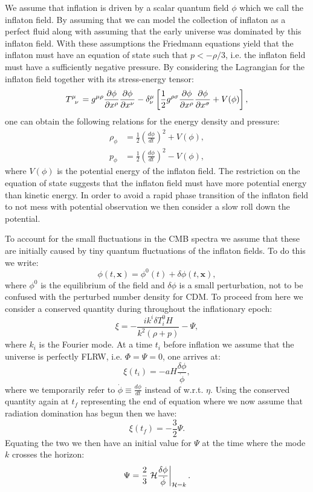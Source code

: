 \documentclass[%
reprint,
 amsmath,amssymb,
 aps,
]{revtex4-2}
\newcommand{\Hp}{\mathcal{H}}
\begin{document}
We assume that inflation is driven by a scalar quantum field $\phi$ which we call the inflaton field. By assuming that we can model the collection of inflaton as a perfect fluid along with assuming that the early universe was dominated by this inflaton field. With these assumptions the Friedmann equations yield that the inflaton must have an equation of state such that $p<-\rho/3$, i.e. the inflaton field must have a sufficiently negative pressure. By considering the Lagrangian for the inflaton field together with its stress-energy tensor: \cite{Dodelson:2003ft}
\[\tensor{T}{^\mu_\nu}=g^{\mu\rho}\pdv{\phi}{x^\rho}\pdv{\phi}{x^\nu}-\delta^\mu_\nu\left[\frac{1}{2}g^{\rho\sigma}\pdv{\phi}{x^\rho}\pdv{\phi}{x^\sigma}+V(\phi)\right],\]
one can obtain the following relations for the energy density and pressure:
\begin{align*}
	\rho_\phi&=\frac{1}{2}\left(\frac{d\phi}{dt}\right)^2+V(\phi),\\
	p_\phi&=\frac{1}{2}\left(\frac{d\phi}{dt}\right)^2-V(\phi),
\end{align*}
where $V(\phi)$ is the potential energy of the inflaton field. The restriction on the equation of state suggests that the inflaton field must have more potential energy than kinetic energy. In order to avoid a rapid phase transition of the inflaton field to not mess with potential observation we then consider a slow roll down the potential. 

To account for the small fluctuations in the CMB spectra we assume that these are initially caused by tiny quantum fluctuations of the inflaton fields. To do this we write:
\[\phi(t,\textbf{x})=\phi^0(t)+\delta\phi(t,\textbf{x}),\]
where $\phi^0$ is the equilibrium of the field and $\delta\phi$ is a small perturbation, not to be confused with the perturbed number density for CDM. To proceed from here we consider a conserved quantity during throughout the inflationary epoch:
\begin{equation}
	\xi=-\frac{ik^i\delta T_i^0H}{k^2(\rho+p)}-\Psi,
	\label{eq:xi}
\end{equation}
where $k_i$ is the Fourier mode. At a time $t_i$ before inflation we assume that the universe is perfectly FLRW, i.e. $\Phi=\Psi=0$, one arrives at:
\[\xi(t_i)=-aH\frac{\delta\phi}{\dot\phi},\]
where we temporarily refer to $\dot\phi\equiv\frac{d\phi}{dt}$ instead of w.r.t. $\eta$. Using the conserved quantity again at $t_f$ representing the end of equation where we now assume that radiation domination has begun then we have:
\[\xi(t_f)=-\frac{3}{2}\Psi.\]
Equating the two we then have an initial value for $\Psi$ at the time where the mode $k$ crosses the horizon:
\begin{equation}
	\Psi=\frac{2}{3}\eval{\Hp\frac{\delta\phi}{\dot\phi}}_{\Hp=k}.
	\label{Psi_infl}
\end{equation}
\end{document}
